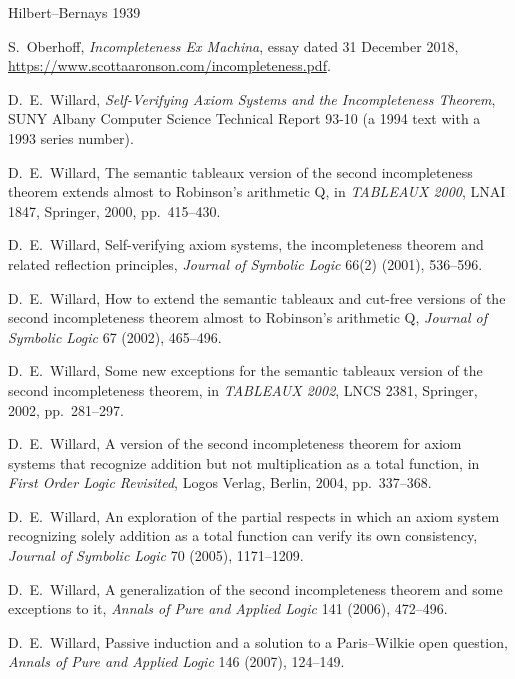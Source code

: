 \documentclass[11pt]{article}
\theoremstyle{plain}
\theoremstyle{definition}
\begin{document}
\begin{thebibliography}{Hilbert--Bernays 1939}\small

 S.~Oberhoff, \emph{Incompleteness Ex Machina}, essay dated
  31 December 2018, \url{https://www.scottaaronson.com/incompleteness.pdf}.

 D.~E.~Willard, \emph{Self-Verifying Axiom Systems and the
  Incompleteness Theorem}, SUNY Albany Computer Science Technical Report
  93-10 (a 1994 text with a 1993 series number).

 D.~E.~Willard, The semantic tableaux version of the second
  incompleteness theorem extends almost to Robinson's arithmetic Q, in
  \emph{TABLEAUX 2000}, LNAI 1847, Springer, 2000, pp.~415--430.

 D.~E.~Willard, Self-verifying axiom systems, the
  incompleteness theorem and related reflection principles, \emph{Journal of
  Symbolic Logic} 66(2) (2001), 536--596.

 D.~E.~Willard, How to extend the semantic tableaux and
  cut-free versions of the second incompleteness theorem almost to Robinson's
  arithmetic Q, \emph{Journal of Symbolic Logic} 67 (2002), 465--496.

 D.~E.~Willard, Some new exceptions for the semantic
  tableaux version of the second incompleteness theorem, in \emph{TABLEAUX
  2002}, LNCS 2381, Springer, 2002, pp.~281--297.

 D.~E.~Willard, A version of the second incompleteness theorem
  for axiom systems that recognize addition but not multiplication as a total
  function, in \emph{First Order Logic Revisited}, Logos Verlag, Berlin,
  2004, pp.~337--368.

 D.~E.~Willard, An exploration of the partial respects in which
  an axiom system recognizing solely addition as a total function can verify
  its own consistency, \emph{Journal of Symbolic Logic} 70 (2005),
  1171--1209.

 D.~E.~Willard, A generalization of the second incompleteness
  theorem and some exceptions to it, \emph{Annals of Pure and Applied Logic}
  141 (2006), 472--496.

 D.~E.~Willard, Passive induction and a solution to a
  Paris--Wilkie open question, \emph{Annals of Pure and Applied Logic} 146
  (2007), 124--149.


\end{thebibliography}
\end{document}
